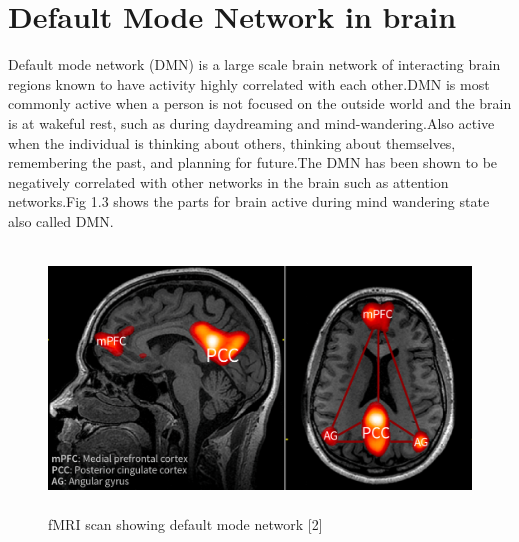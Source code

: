 \section{Default Mode Network in brain}
    Default mode network (DMN) is a large scale brain network of interacting brain regions known to have activity highly correlated with each other.DMN is most commonly active when a person is not focused on the outside world and the brain is at wakeful rest, such as during daydreaming and mind-wandering.Also active when the individual is thinking about others, thinking about themselves, remembering the past, and planning for future.The DMN has been shown to be negatively correlated with other networks in the brain such as attention networks.Fig 1.3 shows the parts for brain active during mind wandering state also called DMN.
    \begin{figure}
        \centering
        \includegraphics[height=7cm]{Pictures/dmn.png}
        \caption{fMRI scan showing default mode network [2]}
        \label{fig:my_label2}
    \end{figure}
